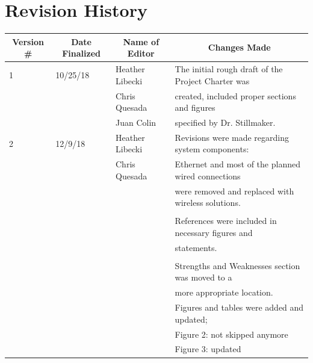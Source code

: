 \maketitle									%
\thispagestyle{empty}						%
\newpage
\thispagestyle{empty}
\setcounter{page}{1}
\section*{Revision History}
\begin{table} [H]	
	\normalsize
	\centering
	\begin{tabular}{|l|l|l|l|}
		\hline
		\multicolumn{1}{|c|}{\textbf{Version \#}} & 
		\multicolumn{1}{|c|}{\textbf{Date Finalized}} &
		\multicolumn{1}{|c|}{\textbf{Name of Editor}} & 
		\multicolumn{1}{|c|}{\textbf{Changes Made}} \\
		\hline
	  1 & 10/25/18 	 & Heather Libecki                 & The initial rough draft of the Project Charter was \\ 
	     &			 & Chris Quesada   		   & created, included proper sections and figures \\ 
	     &			 & Juan Colin     		   & specified by Dr. Stillmaker.\\
		\hline
	   2 & 12/9/18 	 & Heather Libecki  		   & Revisions were made regarding system components:\\ 
	      &			 & Chris Quesada  		   & Ethernet and most of the planned wired connections\\
	      &			 &				   & were removed and replaced with wireless solutions. \\ 
	      &			 &				   & 	\\
	      &			 &				   & References were included in necessary figures and \\
	      &			 &				   & statements. \\
	      &			 &				   & 	\\
	      &			 &				   & Strengths and Weaknesses section was moved to a \\
	      &			 &				   & more appropriate location.\\
	      &			 &				   & Figures and tables were added and updated;\\
	      &			 &				   & Figure 2: not skipped anymore\\
	      &         		 &                			   & Figure 3: updated\\

\end{tabular}
\end{table}
